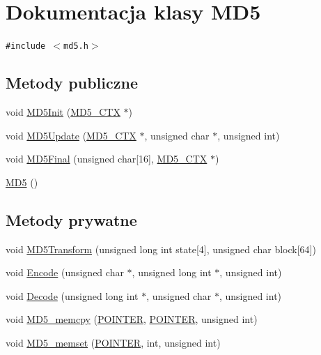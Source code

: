 \hypertarget{a00002}{
\section{Dokumentacja klasy MD5}
\label{d7/d46/a00002}
}
{\tt \#include $<$md5.h$>$}

\subsection*{Metody publiczne}
\begin{CompactItemize}
\item 
void \hyperlink{a00002_72b35c041cb6983aaa74e2f1c31d5a29}{MD5Init} (\hyperlink{a00003}{MD5\_\-CTX} $\ast$)
\item 
void \hyperlink{a00002_a59116f0a26354a217fa186a43cd9d28}{MD5Update} (\hyperlink{a00003}{MD5\_\-CTX} $\ast$, unsigned char $\ast$, unsigned int)
\item 
void \hyperlink{a00002_98039031d87c1f5b787050e2b487d83f}{MD5Final} (unsigned char\mbox{[}16\mbox{]}, \hyperlink{a00003}{MD5\_\-CTX} $\ast$)
\item 
\hyperlink{a00002_fa6155ec36de415ab2dcf5e54b670d13}{MD5} ()
\end{CompactItemize}
\subsection*{Metody prywatne}
\begin{CompactItemize}
\item 
void \hyperlink{a00002_849ad3347bad15a23f3a40452476b1e0}{MD5Transform} (unsigned long int state\mbox{[}4\mbox{]}, unsigned char block\mbox{[}64\mbox{]})
\item 
void \hyperlink{a00002_c3c05716498203127920ba78b3ae8115}{Encode} (unsigned char $\ast$, unsigned long int $\ast$, unsigned int)
\item 
void \hyperlink{a00002_ef62580b93f2122c62493464787b814a}{Decode} (unsigned long int $\ast$, unsigned char $\ast$, unsigned int)
\item 
void \hyperlink{a00002_76c181f092e81df65dadf8861272ac80}{MD5\_\-memcpy} (\hyperlink{a00010_73204e40637f83518fb695362ea084a4}{POINTER}, \hyperlink{a00010_73204e40637f83518fb695362ea084a4}{POINTER}, unsigned int)
\item 
void \hyperlink{a00002_e1a522aab83da49d1bd3f0a6f3edcd11}{MD5\_\-memset} (\hyperlink{a00010_73204e40637f83518fb695362ea084a4}{POINTER}, int, unsigned int)
\end{CompactItemize}


